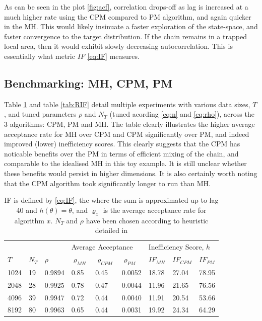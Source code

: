 \documentclass{article}
\begin{document}
As can be seen in the plot \ref{fig:acf}, correlation drops-off as lag is increased at a much higher rate using the CPM compared to PM algorithm, and again quicker in the MH. This would likely insinuate a faster exploration of the state-space, and faster convergence to the target distribution. If the chain remains in a trapped local area, then it would exhibit slowly decreasing autocorrelation. This is essentially what metric $IF$ \eqref{eq:IF} measures.

\subsection{Benchmarking: MH, CPM, PM}

Table \ref{tab:table} and table \ref{tab:RIF} detail multiple experiments with various data sizes, $T$, and tuned parameters $\rho$ and $N_T$ (tuned acording \eqref{eq:n} and \eqref{eq:rho}), across the 3 algorithms: CPM, PM and MH. The table clearly illustrates the higher average acceptance rate for MH over CPM and CPM significantly over PM, and indeed improved (lower) inefficiency scores. This clearly suggests that the CPM has noticable benefits over the PM in terms of efficient mixing of the chain, and comparable to the idealised MH in this toy example. It is still unclear whether these benefits would persist in higher dimensions. It is also certainly worth noting that the CPM algorithm took significantly longer to run than MH.

\begin{table}[H]
\centering
\begin{tabular}{|l|ll|lll|lll|}
\hline
     & \multicolumn{2}{l|}{} & \multicolumn{3}{l|}{Average Acceptance}           & \multicolumn{3}{l|}{Inefficiency Score, $h$} \\
$T$  & $N_T$     & $\rho$    & $\varrho_{MH}$ & $\varrho_{CPM}$ & $\varrho_{PM}$ & $IF_{MH}$     & $IF_{CPM}$    & $IF_{PM}$    \\ \hline
1024 & 19        & 0.9894    & 0.85           & 0.45            & 0.0052         & 18.78         & 27.04         & 78.95        \\
2048 & 28        & 0.9925    & 0.78           & 0.47            & 0.0044         & 11.96         & 21.65         & 76.56        \\
4096 & 39        & 0.9947    & 0.72          & 0.44            & 0.0040         & 11.91         & 20.54         & 53.66        \\
8192 & 80        & 0.9963    & 0.65           & 0.44            & 0.0031         & 19.92         & 24.34         & 64.29        \\ \hline
\end{tabular}
\caption{IF is defined by \eqref{eq:IF}, the where the sum is approximated up to lag 40 and $h(\theta)=\theta$, and $\varrho_{x}$ is the average acceptance rate for algorithm $x$. $N_T$ and $\rho$ have been chosen according to heuristic detailed in \cite{cpmmDeligiannidis2015}}
\label{tab:table}
\end{table}
\end{document}
